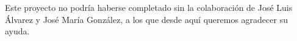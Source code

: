 \section*{}
\label{chap:prologo}

Este proyecto no podría haberse completado sin la colaboración de José Luis Álvarez y José María González, a los que desde aquí queremos 
agradecer su ayuda.
